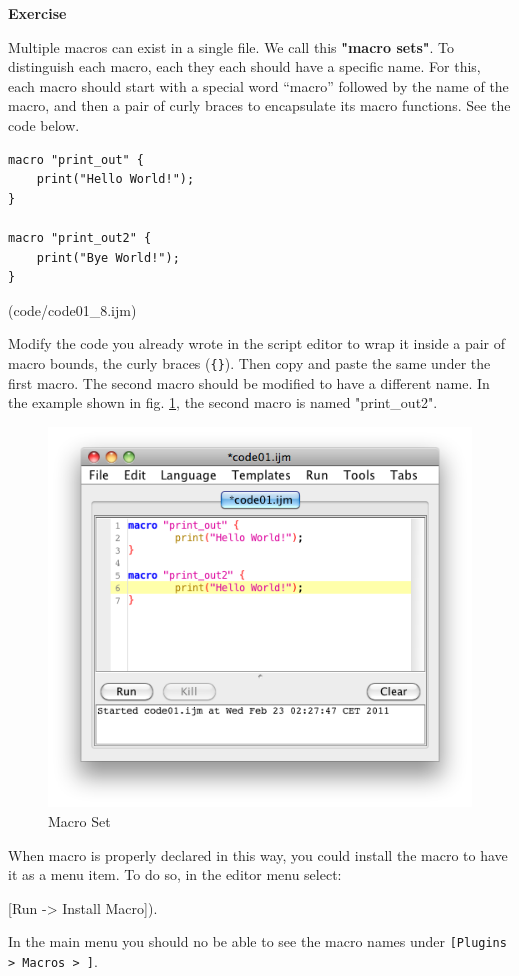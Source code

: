 \documentclass[11pt,a4paper,oneside]{report}
\newenvironment{indentexercise}[1]
{{\setlength{\leftmargin}{2em}}
\textbf{Exercise \thesubsection-#1}
\begin{list}{}
	\item
}
{\end{list}}
\newenvironment{indentFiji}
{\begin{list}{}
         {\setlength{\leftmargin}{1em}}
         \item[]
}
{\end{list}}
\newcommand{\ijmenu}[1]{\texttt{\small#1}}
\newcommand{\ilcom}[1]{\texttt{\small#1}}
\begin{document}
\begin{indentexercise}{3}
\item Multiple macros can exist in a single file. We call this \textbf{"macro sets"}. To distinguish each macro, each they each should have a specific name. For this, each macro should start with a special word ``macro'' followed by the name of the macro, and then a pair of curly braces to encapsulate its macro functions. See the code below.  


\begin{lstlisting}
macro "print_out" {
	print("Hello World!");
}

macro "print_out2" {
	print("Bye World!");
}

\end{lstlisting}
(code/code01_8.ijm)

Modify the code you already wrote in the script editor to wrap it inside a pair of macro bounds, the curly braces (\ilcom{\{\}}).  Then copy and paste the same under the first macro. 
The second macro should be modified to have a different name. In the example shown in fig.
\ref{fig_MacroSetInMenu}, the second macro is named "print\_out2".
\begin{figure}[htbp]
\begin{center}
\includegraphics[scale=0.6]{fig/editor_MacroSet.png}
\caption{Macro Set} \label{fig_MacroSetInMenu}
\end{center}
\end{figure}
When macro is properly declared in this way, you could install the macro to have it as a menu item. To do so, in the editor menu select: 
\begin{indentFiji}
[Run -> Install Macro]).
\end{indentFiji}
In the main menu you should no be able to see the macro names under \ijmenu{[Plugins > Macros > ]}.


\end{indentexercise}
\end{document}
